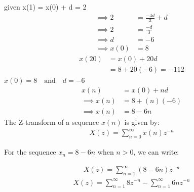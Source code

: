 \documentclass[journal,12pt,twocolumn]{IEEEtran}
\theoremstyle{remark}
\begin{document}
    given x(1) = x(0) + d = 2
    \begin{align}
        \implies 2 &= \frac{-4d}{3} +d\\
        \implies 2 &= \frac{-d}{3}\\
        \implies d &= -6\\
        \implies x(0) &= 8
    \end{align}
    \begin{align}
        x(20)&=x(0)+20d\\
        &=8+20(-6) = -112
    \end{align}
\centering
$x(0) = 8\quad \text{and}\quad d = -6$
    \begin{align}
        x(n)&=x(0)+nd\\
        \implies x(n)&=8+(n)(-6)\\
        \implies x(n)&=8-6n
    \end{align}    
The Z-transform of a sequence $x(n)$ is given by:
    \begin{align}
        X(z) = \sum_{n=0}^{\infty} x(n) z^{-n} 
    \end{align}

For the sequence $x_n = 8 - 6n$ when $n > 0$, we can write:

    \begin{align}
        X(z) = \sum_{n=1}^{\infty} (8 - 6n)z^{-n}
    \end{align}
    \begin{align}
         X(z) = \sum_{n=1}^{\infty} 8z^{-n} - \sum_{n=1}^{\infty} 6nz^{-n} 
    \end{align}
\end{document}
